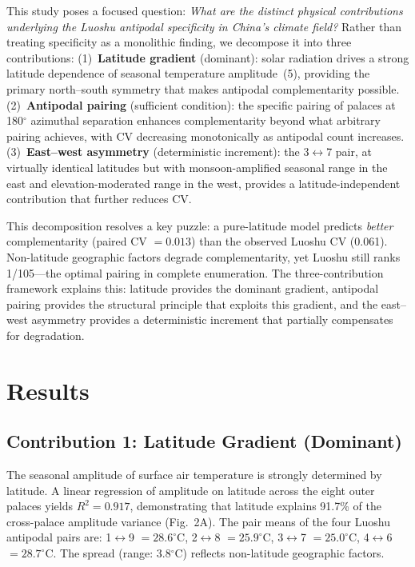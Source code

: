 \documentclass[9pt,twocolumn]{article}
\begin{document}
This study poses a focused question: \textit{What are the distinct physical contributions underlying the Luoshu antipodal specificity in China's climate field?} Rather than treating specificity as a monolithic finding, we decompose it into three contributions: (1)~\textbf{Latitude gradient} (dominant): solar radiation drives a strong latitude dependence of seasonal temperature amplitude~(5), providing the primary north--south symmetry that makes antipodal complementarity possible. (2)~\textbf{Antipodal pairing} (sufficient condition): the specific pairing of palaces at 180$^\circ$ azimuthal separation enhances complementarity beyond what arbitrary pairing achieves, with CV decreasing monotonically as antipodal count increases. (3)~\textbf{East--west asymmetry} (deterministic increment): the 3$\leftrightarrow$7 pair, at virtually identical latitudes but with monsoon-amplified seasonal range in the east and elevation-moderated range in the west, provides a latitude-independent contribution that further reduces CV.

This decomposition resolves a key puzzle: a pure-latitude model predicts \textit{better} complementarity (paired CV $= 0.013$) than the observed Luoshu CV (0.061). Non-latitude geographic factors degrade complementarity, yet Luoshu still ranks 1/105---the optimal pairing in complete enumeration. The three-contribution framework explains this: latitude provides the dominant gradient, antipodal pairing provides the structural principle that exploits this gradient, and the east--west asymmetry provides a deterministic increment that partially compensates for degradation.

\section*{Results}

\subsection*{Contribution 1: Latitude Gradient (Dominant)}

The seasonal amplitude of surface air temperature is strongly determined by latitude. A linear regression of amplitude on latitude across the eight outer palaces yields $R^2 = 0.917$, demonstrating that latitude explains 91.7\% of the cross-palace amplitude variance (Fig.~2A). The pair means of the four Luoshu antipodal pairs are: 1$\leftrightarrow$9 $= 28.6^\circ$C, 2$\leftrightarrow$8 $= 25.9^\circ$C, 3$\leftrightarrow$7 $= 25.0^\circ$C, 4$\leftrightarrow$6 $= 28.7^\circ$C. The spread (range: 3.8$^\circ$C) reflects non-latitude geographic factors.
\end{document}
